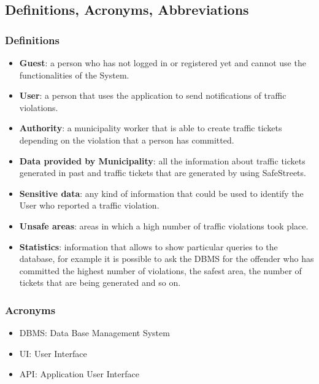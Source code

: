 \subsection{Definitions, Acronyms, Abbreviations}
    \subsubsection{Definitions}
        \begin{itemize}
            \item \textbf{Guest}: a person who has not logged in or registered yet and cannot use the functionalities of the System.
            \item \textbf{User}: a person that uses the application to send notifications of traffic violations.
            \item \textbf{Authority}: a municipality worker that is able to create traffic tickets depending on the violation that a person has committed.
            \item \textbf{Data provided by Municipality}: all the information about traffic tickets generated in past and traffic tickets that are generated by using SafeStreets.
            \item \textbf{Sensitive data}: any kind of information that could be used to identify the User who reported a traffic violation.
            \item \textbf{Unsafe areas}: areas in which a high number of traffic violations took place.
            \item \textbf{Statistics}: information that allows to show particular queries to the database, for example it is possible to ask the DBMS for the offender who has committed the highest number of violations, the safest area, the number of tickets that are being generated and so on.
        \end{itemize}
        
    \subsubsection{Acronyms}
    \begin{itemize}
        \item DBMS: Data Base Management System
        \item UI: User Interface
        \item API: Application User Interface
    \end{itemize}
